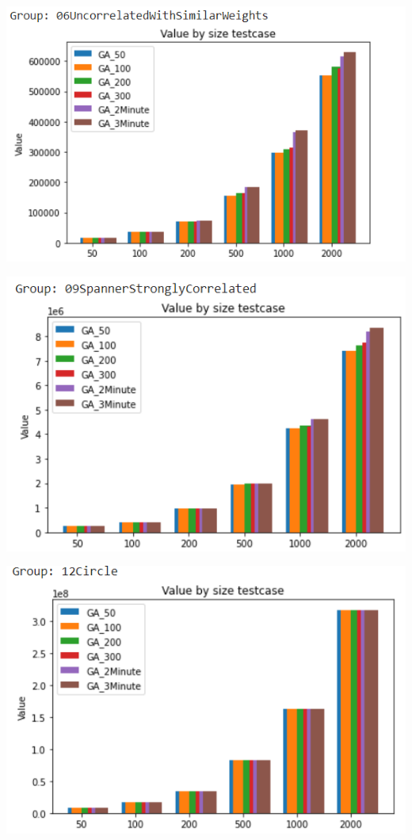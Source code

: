 \documentclass{article}
\begin{document}
\begin{center}
    \centering
    \includegraphics[width=15cm]{image/AI10.png}
\end{center}
\begin{center}
    \centering
    \includegraphics[width=15cm]{image/AI11.png}
\end{center}
\begin{center}
    \centering
    \includegraphics[width=15cm]{image/AI12.png}
\end{center}
\end{document}

